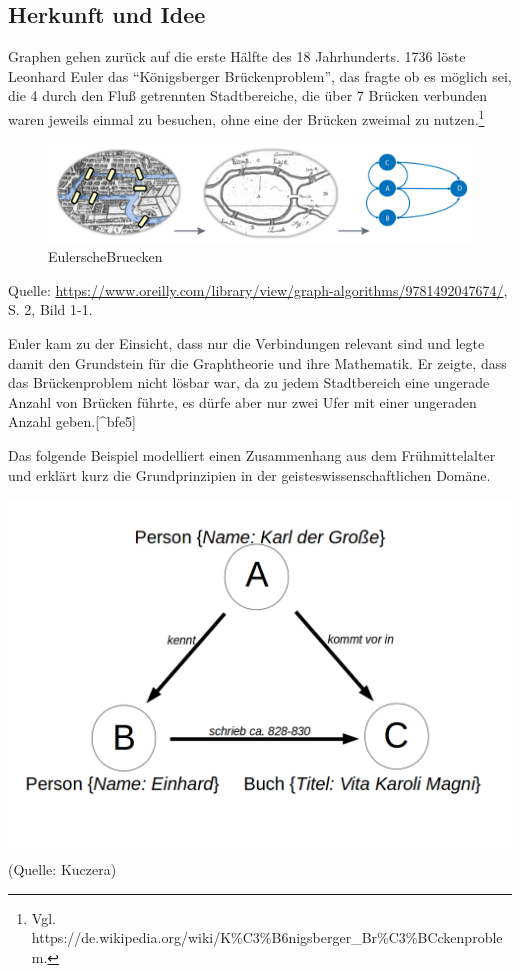 \documentclass[12pt,ngerman,]{article}
\begin{document}
\subsection{Herkunft und Idee}\label{herkunft-und-idee}

Graphen gehen zurück auf die erste Hälfte des 18 Jahrhunderts. 1736
löste Leonhard Euler das ``Königsberger Brückenproblem'', das fragte ob
es möglich sei, die 4 durch den Fluß getrennten Stadtbereiche, die über
7 Brücken verbunden waren jeweils einmal zu besuchen, ohne eine der
Brücken zweimal zu nutzen.\footnote{Vgl.
  https://de.wikipedia.org/wiki/K\%C3\%B6nigsberger\_Br\%C3\%BCckenproblem.}

\begin{figure}
\centering
\includegraphics{Bilder/Eulersche-Bruecken.png}
\caption{EulerscheBruecken}
\end{figure}

Quelle:
\href{Needham/Hodler\%202019}{https://www.oreilly.com/library/view/graph-algorithms/9781492047674/},
S. 2, Bild 1-1.

Euler kam zu der Einsicht, dass nur die Verbindungen relevant sind und
legte damit den Grundstein für die Graphtheorie und ihre Mathematik. Er
zeigte, dass das Brückenproblem nicht lösbar war, da zu jedem
Stadtbereich eine ungerade Anzahl von Brücken führte, es dürfe aber nur
zwei Ufer mit einer ungeraden Anzahl geben.{[}\^{}bfe5{]}

Das folgende Beispiel modelliert einen Zusammenhang aus dem
Frühmittelalter und erklärt kurz die Grundprinzipien in der
geisteswissenschaftlichen Domäne.

\includegraphics{Bilder/Beispielgraph.png} (Quelle: Kuczera)
\end{document}
